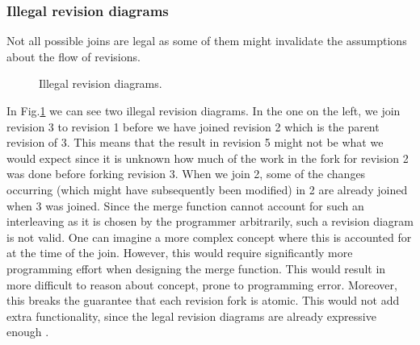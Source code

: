 \documentclass[12pt,twoside,notitlepage]{report}
\begin{document}
\subsubsection{Illegal revision diagrams}
Not all possible joins are legal as some of them might invalidate the assumptions about the flow of revisions.

\begin{figure}[ht!]
\centering


\caption{Illegal revision diagrams.}
\label{fig2}
\end{figure}


In Fig.\ref{fig2} we can see two illegal revision diagrams. In the one on the left, we join revision 3 to revision 1 before we have joined revision 2 which is the parent revision of 3. This means that the result in revision 5 might not be what we would expect since it is unknown how much of the work in the fork for revision 2 was done before forking revision 3. When we join 2, some of the changes occurring (which might have subsequently been modified) in 2 are already joined when 3 was joined. Since the merge function cannot account for such an interleaving as it is chosen by the programmer arbitrarily, such a revision diagram is not valid. One can imagine a more complex concept where this is accounted for at the time of the join. However, this would require significantly more programming effort when designing the merge function. This would result in more difficult to reason about concept, prone to programming error. Moreover, this breaks the guarantee that each revision fork is atomic. This would not add extra functionality, since the legal revision diagrams are already expressive enough \cite{conrev}. 
\end{document}

